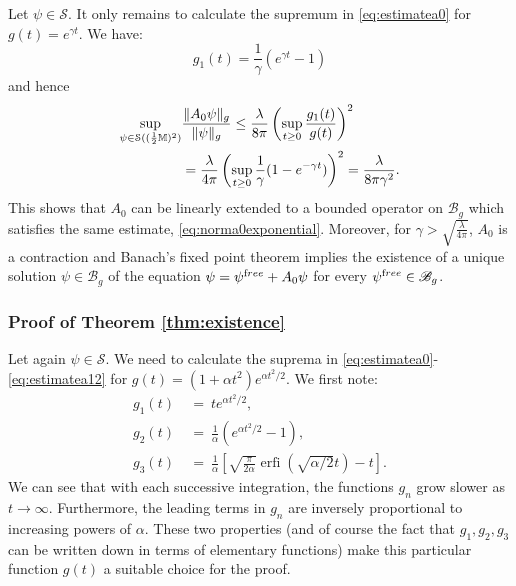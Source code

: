\documentclass[b5paper,draft,openbib,12pt]{memoir}
\newcommand{\M}{\mathbb{M}}
\newcommand{\free}{{\textup free}}
\newcommand{\Banach}{\mathscr{B}}
\DeclareMathOperator{\erfi}{erfi}
\begin{document}
Let $\psi \in \mathcal{S}$. It only remains to calculate the 
supremum in \eqref{eq:estimatea0} for $g(t)=e^{\gamma t}$. We have:
\begin{equation}
	g_1(t) = \frac{1}{\gamma} \left( e^{\gamma t} - 1\right)
\end{equation}
and hence
\begin{align}
  \sup_{\psi \in \mathcal{S}((\frac{1}{2}\M)^2)} &\frac{\| A_0 \psi \|_g}{\| \psi \|_g} \leq \frac{\lambda}{8\pi} \left( \sup_{t \geq 0} \frac{g_1(t)}{g(t)} \right)^2 \notag\\
  &= \frac{\lambda}{4\pi} \left( \sup_{t \geq 0} \frac{1}{\gamma} (1 - e^{-\gamma t}) \right)^2 = \frac{\lambda}{8\pi \gamma^2}. 
\end{align}
This shows that $A_0$ can be linearly extended to a bounded operator 
on $\Banach_g$ which satisfies the same estimate, 
\eqref{eq:norma0exponential}. Moreover, for $\gamma > 
\sqrt{\frac{\lambda}{4\pi}}$, $A_0$ is a contraction and Banach's 
fixed point theorem implies the existence of a unique solution 
$\psi \in \Banach_g$ of the equation $\psi = \psi^\free + A_0 \psi$ 
for every $\psi^\free \in \Banach_g$.


\subsubsection{Proof of Theorem \ref{thm:existence}} \label{sec:proofexistence}

Let again $\psi \in \mathcal{S}$. We need to calculate the suprema 
in \eqref{eq:estimatea0}-\eqref{eq:estimatea12} for 
$g(t)=(1+\alpha t^2)e^{\alpha t^2/2}$. We first note:
\begin{align}
	g_1(t) ~&=~ t e^{\alpha t^2/2},\nonumber\\
	g_2(t) ~&=~\frac{1}{\alpha} \left( e^{\alpha t^2/2}-1 \right),\nonumber\\
	g_3(t) ~&=~\frac{1}{\alpha} \left[ \sqrt{\frac{\pi}{2\alpha}} \erfi(\sqrt{\alpha/2} t)-t \right].
\end{align}
We can see that with each successive integration, the functions 
$g_n$ grow slower as $t\rightarrow \infty$. Furthermore, the leading 
terms in $g_n$ are inversely proportional to increasing powers of 
$\alpha$. These two properties (and of course the fact that $g_1, 
g_2,g_3$ can be written down in terms of elementary functions) make 
this particular function $g(t)$ a suitable choice for the proof.
\end{document}
